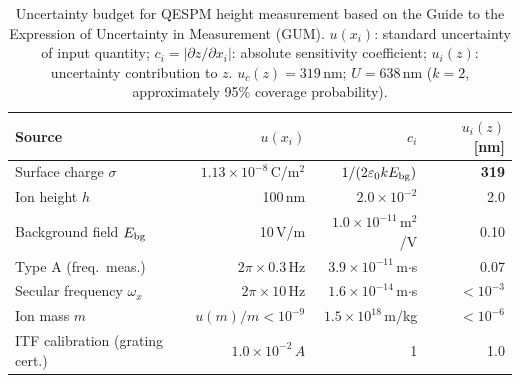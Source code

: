 \documentclass[12pt,a4paper]{article}
\begin{document}
\begin{table}[htb]
\centering
\caption{Uncertainty budget for QESPM height measurement based on the
Guide to the Expression of Uncertainty in Measurement (GUM).
         $u(x_i)$: standard uncertainty of input quantity;
         $c_i = |\partial z/\partial x_i|$: absolute sensitivity coefficient;
         $u_i(z)$: uncertainty contribution to $z$.
         $u_c(z) = 319$\,nm; $U = 638$\,nm ($k = 2$, approximately 95\% coverage probability).}
\label{tab:uncertainty}
\small
\setlength{\tabcolsep}{4pt}
\begin{tabular}{@{}lrrr@{}}
\hline
Source & $u(x_i)$ & $c_i$ & $u_i(z)$ [nm] \\
\hline
Surface charge $\sigma$ & $1.13\!\times\!10^{-8}$\,C/m$^2$ & $1/(2\varepsilon_0 k E_{\rm bg})$ & \textbf{319} \\
Ion height $h$ & 100\,nm & $2.0\!\times\!10^{-2}$ & 2.0 \\
Background field $E_{\rm bg}$ & 10\,V/m & $1.0\!\times\!10^{-11}$\,m$^2$/V & 0.10 \\
Type A (freq.\ meas.) & $2\pi\!\times\!0.3$\,Hz & $3.9\!\times\!10^{-11}$\,m$\cdot$s & 0.07 \\
Secular frequency $\omega_x$ & $2\pi\!\times\!10$\,Hz & $1.6\!\times\!10^{-14}$\,m$\cdot$s & $<10^{-3}$ \\
Ion mass $m$ & $u(m)/m<10^{-9}$ & $1.5\!\times\!10^{18}$\,m/kg & $<10^{-6}$ \\
ITF calibration (grating cert.) & $1.0\!\times\!10^{-2}\,A$ & 1 & 1.0 \\
\hline
\end{tabular}
\end{table}
\end{document}

